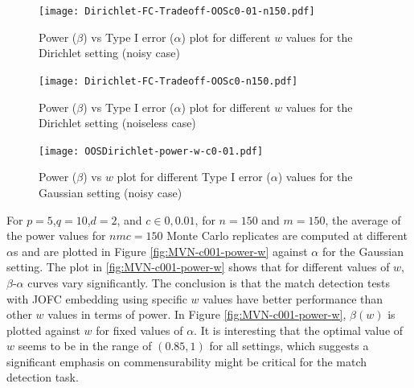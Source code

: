 \documentclass[12pt,oneside,final]{thesis}\usepackage[]{graphicx}\usepackage[]{color}
\begin{document}
\begin{figure}
\texttt{[image: Dirichlet-FC-Tradeoff-OOSc0-01-n150.pdf]}
\caption{Power ($\beta$) vs Type I error ($\alpha$) plot for different $w$ values for the Dirichlet setting (noisy case)}
\label{fig:Dir-c001-power-alpha}
\end{figure}

\begin{figure}
\texttt{[image: Dirichlet-FC-Tradeoff-OOSc0-n150.pdf]}
\caption{Power ($\beta$) vs Type I error ($\alpha$) plot for different $w$ values for the Dirichlet setting (noiseless case)}
\label{fig:Dir-c0-power-alpha}
\end{figure}

\begin{figure}
\texttt{[image: OOSDirichlet-power-w-c0-01.pdf]}
\caption{Power ($\beta$) vs $w$ plot for different Type I error ($\alpha$) values for the Gaussian setting (noisy case)}
\label{fig:Dir-c001-power-w}
\end{figure}

For $p=5$,$q=10$,$d=2$, and $c\in{0,0.01}$, for $n=150$ and $m=150$, the average of the power values for $nmc=150$ Monte Carlo replicates are computed at  different $\alpha$s and are plotted in Figure \ref{fig:MVN-c001-power-w} against $\alpha$ for the Gaussian setting.  
The plot in \autoref{fig:MVN-c001-power-w} shows that for different values of  $w$, $\beta$-$\alpha$ curves vary significantly.  The conclusion is that the match detection tests with JOFC embedding using specific $w$ values have better performance than other $w$ values in terms of power.  In Figure
 \ref{fig:MVN-c001-power-w},  $\beta(w)$ is plotted against $w$ for fixed values of $\alpha$. It is  interesting that the optimal value of $w$ seems to be in the range of $(0.85,1)$ for all settings, which suggests a significant emphasis on commensurability might be  critical for the match detection  task. 

\end{document}
